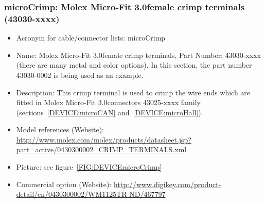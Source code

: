 \subsubsection{microCrimp: Molex Micro-Fit 3.0\texttrademark female crimp terminals (43030-xxxx)} \label{DEVICE:microCrimp}
\begin{itemize}
  \item Acronym for cable/connector lists: microCrimp
  \item Name: Molex Micro-Fit 3.0\texttrademark female crimp terminals, Part Number: 43030-xxxx (there are many metal and color options). In this section, the part number 43030-0002 is being used as an example.
  \item Description: This crimp terminal is used to crimp the wire ends which are fitted in Molex Micro-Fit 3.0\texttrademark connectors 43025-xxxx family (sections~\ref{DEVICE:microCAN} and~\ref{DEVICE:microHall}).
  \item Model references (Website): \href{http://www.molex.com/molex/products/datasheet.jsp?part=active/0430300002\_CRIMP\_TERMINALS.xml}{http://www.molex.com/molex/products/datasheet.jsp?part=active/0430300002\_CRIMP\_TERMINALS.xml}
  \item Picture: see figure~\ref{FIG:DEVICEmicroCrimp}
  \item Commercial option (Website): \href{http://www.digikey.com/product-detail/en/0430300002/WM1125TR-ND/467797}{http://www.digikey.com/product-detail/en/0430300002/WM1125TR-ND/467797}
\end{itemize}

